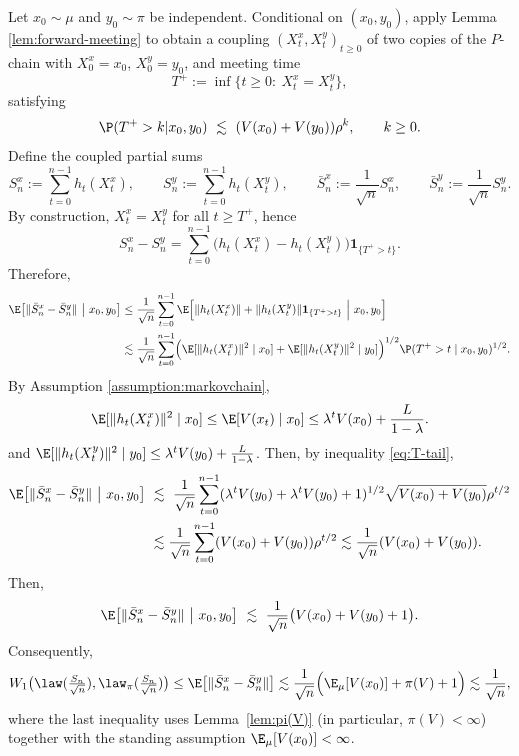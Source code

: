 \documentclass[mnsc,nonblindrev]{informs3}
\begin{document}
Let $x_0\sim \mu$ and $y_0\sim \pi$ be independent. Conditional on $(x_0,y_0)$,
apply Lemma \ref{lem:forward-meeting} to obtain a coupling
$(X_t^x,X_t^y)_{t\ge 0}$ of two copies of the $P$-chain with
$X_0^x=x_0$, $X_0^y=y_0$, and meeting time
\[
  T^+:=\inf\{t\ge 0:\ X_t^x=X_t^y\},
\]
satisfying
\begin{equation}\label{eq:T-tail}
\P(T^+>k | x_0,y_0)\ \lesssim\ (V(x_0)+V(y_0))\rho^k,
  \qquad k\ge 0.
\end{equation}
Define the coupled partial sums
\[
  S_n^x:=\sum_{t=0}^{n-1} h_t(X_t^x),
  \qquad
  S_n^y:=\sum_{t=0}^{n-1} h_t(X_t^y),
  \qquad
  \bar S_n^x:=\frac{1}{\sqrt n}S_n^x, \qquad \bar S_n^y:=\frac{1}{\sqrt n}S_n^y .
\]
By construction, $X_t^x=X_t^y$ for all $t\ge T^+$, hence
\[
  S_n^x-S_n^y=\sum_{t=0}^{n-1}\bigl(h_t(X_t^x)-h_t(X_t^y)\bigr)\mathbf 1_{\{T^+>t\}}.
\]
Therefore, 
\begin{align*}
  \E\bigl[\|\bar S_n^x-\bar S_n^y\|\ \big|\ x_0,y_0\bigr]
  &\le \frac{1}{\sqrt n}\sum_{t=0}^{n-1}
      \E\Bigl[\|h_t(X_t^x)\|+\|h_t(X_t^y)\|\mathbf 1_{\{T^+>t\}}
      \ \Big|\ x_0,y_0\Bigr] \\
  &\lesssim \frac{1}{\sqrt n}\sum_{t=0}^{n-1}
      \Bigl(\E[\|h_t(X_t^x)\|^2\mid x_0]+\E[\|h_t(X_t^y)\|^2\mid y_0]\Bigr)^{1/2}
      \P(T^+>t\mid x_0,y_0)^{1/2}.
\end{align*}
By Assumption \ref{assumption:markovchain},
\begin{align*}
\E[\|h_t(X_t^x)\|^2\mid x_0]\le \E[V(x_t)\mid x_0] \leq \lambda^tV(x_0) + \frac{L}{1-\lambda}.
\end{align*}
and
$\E[\|h_t(X_t^y)\|^2\mid y_0]\le \lambda^tV(y_0) + \frac{L}{1-\lambda}$. Then, by inequality \eqref{eq:T-tail},
\begin{align*}
  \E\bigl[\|\bar S_n^x-\bar S_n^y\|\ \big|\ x_0,y_0\bigr]
  \ &\lesssim\ \frac{1}{\sqrt n}\sum_{t=0}^{n-1}
  (\lambda^tV(y_0) + \lambda^tV(y_0) + 1)^{1/2}
  \sqrt{V(x_0)+V(y_0)}\rho^{t/2}\\&\lesssim \frac{1}{\sqrt n}\sum_{t=0}^{n-1}
  (V(x_0)+V(y_0))\rho^{t/2} \lesssim \frac{1}{\sqrt n}
  (V(x_0)+V(y_0)).
\end{align*}
Then, 
\begin{equation*}
  \E\bigl[\|\bar S_n^x-\bar S_n^y\|\ \big|\ x_0,y_0\bigr]
  \ \lesssim\ \frac{1}{\sqrt n}\bigl(V(x_0)+V(y_0)+1\bigr).
\end{equation*}
Consequently,
\begin{equation}\label{eq:W1-to-stationary}
 W_1\bigl(\law(\tfrac{S_n}{\sqrt{n}}),\law_\pi(\tfrac{S_n}{\sqrt{n}})\bigr)
  \le \E\bigl[\|\bar S_n^x-\bar S_n^y\|\bigr]
  \lesssim \frac{1}{\sqrt n}\Bigl(\E_\mu[V(x_0)]+\pi(V)+1\Bigr)
  \lesssim \frac{1}{\sqrt n},
\end{equation}
where the last inequality uses Lemma~\ref{lem:pi(V)} (in particular, $\pi(V)<\infty$)
together with the standing assumption $\E_\mu[V(x_0)]<\infty$.
\end{document}
